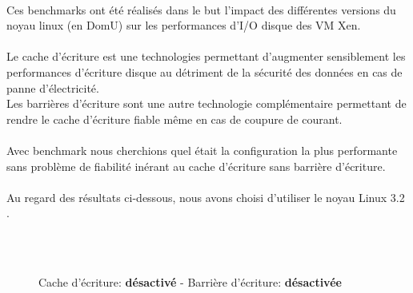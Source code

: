\paragraph*{}
Ces benchmarks ont été réalisés dans le but l'impact des différentes versions du noyau linux
(en DomU) sur les performances d'I/O disque des VM Xen.

\paragraph*{}
Le cache d'écriture est une technologies permettant d'augmenter sensiblement les performances d'écriture disque au détriment de la sécurité des données en cas de panne
d'électricité.\\
Les barrières d'écriture sont une autre technologie complémentaire permettant de rendre le cache d'écriture fiable même en cas de coupure de courant.

\paragraph*{}
Avec benchmark nous cherchions quel était la configuration la plus performante sans problème de fiabilité inérant au cache d'écriture sans barrière d'écriture.

\paragraph*{}
Au regard des résultats ci-dessous, nous avons choisi d'utiliser le noyau Linux 3.2 .


\begin{figure}[H]
\centering
{}
\\
\\

\caption{Cache d'écriture: \textbf{désactivé}   -   Barrière d'écriture: \textbf{désactivée}}
\end{figure}

